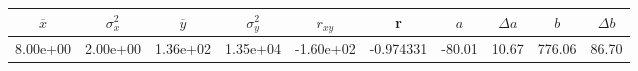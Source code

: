 \begin{tabular}{cccccccccc}
\toprule
$\overline{x}$ & $\sigma_x^2$ & $\overline{y}$ & $\sigma_y^2$ & $r_{xy}$ & r & $a$ & $\Delta a$ & $b$ & $\Delta b$ \\
\midrule
8.00e+00 & 2.00e+00 & 1.36e+02 & 1.35e+04 & -1.60e+02 & -0.974331 & -80.01 & 10.67 & 776.06 & 86.70 \\
\bottomrule
\end{tabular}
